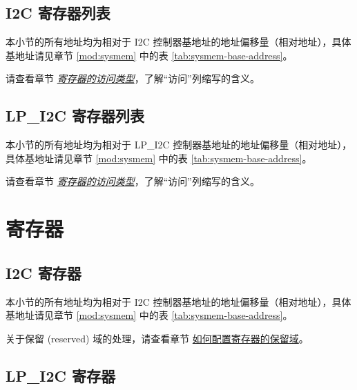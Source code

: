 \documentclass[main\_\_CN.tex]{subfiles}
\begin{document}
\subsection{I2C 寄存器列表}
\label{sec:i2c-reg-summ}
\hypertarget{i2c-reg-summ}{}

本小节的所有地址均为相对于 I2C 控制器基地址的地址偏移量（相对地址），具体基地址请见章节 \ref{mod:sysmem} \textit{} 中的表 \ref{tab:sysmem-base-address}。

请查看章节 \hyperref[glossary-access-types]{\textit{寄存器的访问类型}}，了解“访问”列缩写的含义。



\subsection{LP\_I2C 寄存器列表}
\label{sec:lp-i2c-reg-summ}
\hypertarget{lp-i2c-reg-summ}{}

本小节的所有地址均为相对于 LP\_I2C 控制器基地址的地址偏移量（相对地址），具体基地址请见章节 \ref{mod:sysmem} \textit{} 中的表 \ref{tab:sysmem-base-address}。

请查看章节 \hyperref[glossary-access-types]{\textit{寄存器的访问类型}}，了解“访问”列缩写的含义。





\newpage
\section{寄存器}

\subsection{I2C 寄存器}

本小节的所有地址均为相对于 I2C 控制器基地址的地址偏移量（相对地址），具体基地址请见章节 \ref{mod:sysmem} \textit{} 中的表 \ref{tab:sysmem-base-address}。

关于保留 (reserved) 域的处理，请查看章节 \hyperref[programming-reserved-field]{如何配置寄存器的保留域}。



\subsection{LP\_I2C 寄存器}


\end{document}
